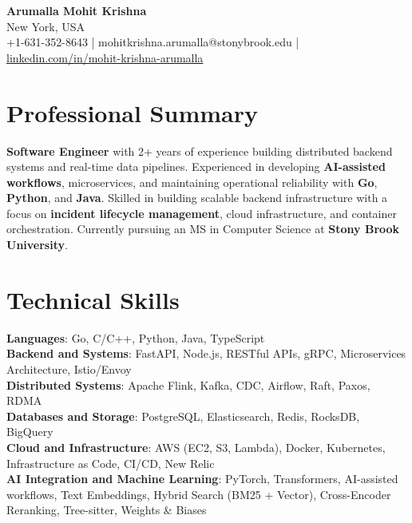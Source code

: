 \documentclass[letterpaper,11pt]{article}
\begin{document}
\begin{center}
  {\Large \textbf{Arumalla Mohit Krishna}} \\
  New York, USA \\
  +1-631-352-8643 \enspace | \enspace mohitkrishna.arumalla@stonybrook.edu \enspace | \enspace \href{https://www.linkedin.com/in/mohit-krishna-arumalla}{linkedin.com/in/mohit-krishna-arumalla}
\end{center}

\section{Professional Summary}
  \begin{itemize}[leftmargin=0.15in, label={}]
    \small{\item{
     \textbf{Software Engineer} with 2+ years of experience building distributed backend systems and real-time data pipelines. Experienced in developing \textbf{AI-assisted workflows}, microservices, and maintaining operational reliability with \textbf{Go}, \textbf{Python}, and \textbf{Java}. Skilled in building scalable backend infrastructure with a focus on \textbf{incident lifecycle management}, cloud infrastructure, and container orchestration. Currently pursuing an MS in Computer Science at \textbf{Stony Brook University}.
    }}
  \end{itemize}
\vspace{-16pt}

\section{Technical Skills}
 \begin{itemize}[leftmargin=0.15in, label={}]
    \small{\item{
     \textbf{Languages}: Go, C/C++, Python, Java, TypeScript \\
     \textbf{Backend and Systems}: FastAPI, Node.js, RESTful APIs, gRPC, Microservices Architecture, Istio/Envoy \\
     \textbf{Distributed Systems}: Apache Flink, Kafka, CDC, Airflow, Raft, Paxos, RDMA \\
     \textbf{Databases and Storage}: PostgreSQL, Elasticsearch, Redis, RocksDB, BigQuery \\
     \textbf{Cloud and Infrastructure}: AWS (EC2, S3, Lambda), Docker, Kubernetes, Infrastructure as Code, CI/CD, New Relic \\
     \textbf{AI Integration and Machine Learning}: PyTorch, Transformers, AI-assisted workflows, Text Embeddings, Hybrid Search (BM25 + Vector), Cross-Encoder Reranking, Tree-sitter, Weights \& Biases
    }}
 \end{itemize}
\vspace{-16pt}
\end{document}
